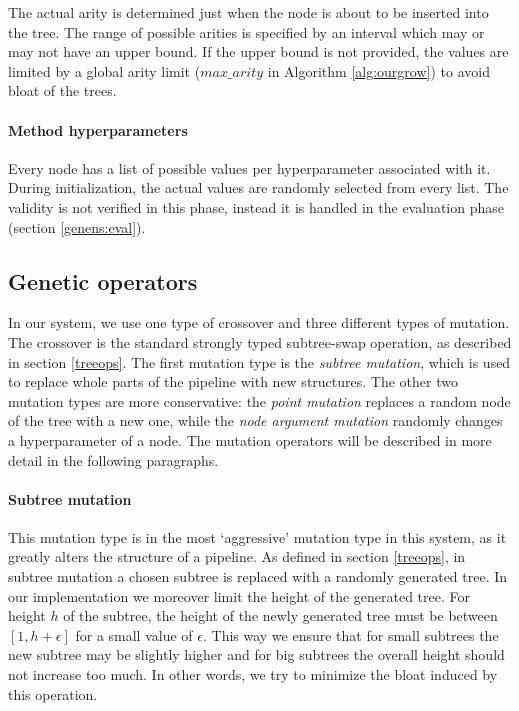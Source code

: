 The actual arity is determined just when the node is about to be inserted
into the tree. The range of possible arities is specified by an interval which may or may not have
an upper bound. If the upper bound is not provided, the values are limited by
a global arity limit ($max\_arity$ in Algorithm \ref{alg:ourgrow}) to avoid bloat
of the trees.

\paragraph{Method hyperparameters}
Every node has a list of possible values per hyperparameter associated with
it. During initialization, the actual values are randomly selected from every list.
The validity is not verified in this phase, instead it is handled in the
evaluation phase (section \ref{genens:eval}).

\subsection{Genetic operators} \label{sec:repro}
In our system, we use one type of crossover and three different types of
mutation. The crossover is the standard strongly typed subtree-swap operation,
as described in section \ref{treeops}. The first mutation type is the \emph{subtree
mutation}, which is used to replace whole parts of the pipeline with new structures.
The other two mutation types are more conservative: the \emph{point mutation} replaces
a random node of the tree with a new one, while the \emph{node argument mutation} randomly
changes a hyperparameter of a node.
The mutation operators will be described in more detail in the following paragraphs.

\paragraph{Subtree mutation}
This mutation type is in the most `aggressive' mutation type in this system, as
it greatly alters the structure of a pipeline. As defined in section \ref{treeops},
in subtree mutation a chosen subtree is
replaced with a randomly generated tree. In our implementation we moreover
limit the height of the generated tree. For height $h$ of the subtree, the
height of the newly generated tree must be between $[1, h + \epsilon]$ for a
small value of $\epsilon$. This way we ensure that for small subtrees the new
subtree may be slightly higher and for big subtrees the overall height should
not increase too much. In other words, we try to minimize the bloat induced by
this operation.

